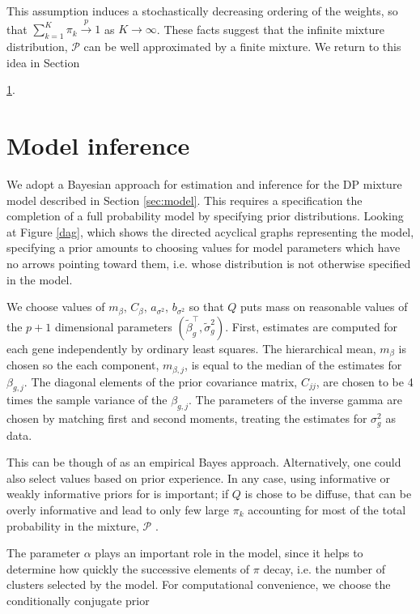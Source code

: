This assumption induces a stochastically decreasing ordering of the weights, so that $\sum_{k=1}^K \pi_k \stackrel{p}{\rightarrow} 1$ as $K\rightarrow \infty$. These facts suggest that the infinite mixture distribution, $\mathcal{P}$ can be well approximated by a finite mixture. We return to this idea in Section {\ref{sec:inference}. 



\section{Model inference}
\label{sec:inference}
We adopt a Bayesian approach for estimation and inference for the DP mixture model described in Section \ref{sec:model}. This requires a specification the completion of a full probability model by specifying prior distributions. Looking at Figure \ref{dag}, which shows the directed acyclical graphs representing the model, specifying a prior amounts to choosing values for model parameters which have no arrows pointing toward them, i.e. whose distribution is not otherwise specified in the model.

We choose values of $m_\beta,\,C_\beta,\,a_{\sigma^2},\,b_{\sigma^2}$ so that $Q$ puts mass on reasonable values of the $p+1$ dimensional parameters $\left(\tilde{\beta}_g^\top,\tilde{\sigma}^2_g\right)$. First, estimates are computed for each gene independently by ordinary least squares. The hierarchical mean, $m_\beta$ is chosen so the each component, $m_{\beta,j}$, is equal to the median of the estimates for $\beta_{g,j}$. The diagonal elements of the prior covariance matrix, $C_{jj}$, are chosen to be 4 times the sample variance of the $\beta_{g,j}$. The parameters of the inverse gamma are chosen by matching first and second moments, treating the estimates for $\sigma^2_g$ as data.

This can be though of as an empirical Bayes approach. Alternatively, one could also select values based on prior experience. In any case, using informative or weakly informative priors for is important; if $Q$ is chose to be diffuse, that can be overly informative and lead to only few large $\pi_k$ accounting for most of the total probability in the mixture, $\mathcal{P}$ \citep{gelman-book}.

The parameter $\alpha$ plays an important role in the model, since it helps to determine how quickly the successive elements of $\pi$ decay, i.e. the number of clusters selected by the model. For computational convenience, we choose the conditionally conjugate prior

}
